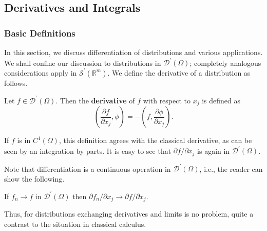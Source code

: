 \subsection{Derivatives and Integrals}\label{sec:distribution-derivatives-integrals}

\subsubsection{Basic Definitions}\label{subsec:distribution-derivative-basic-definitions}

In this section, we discuss differentiation of distributions and various applications. We shall confine our discussion to distributions in $\mathcal{D}^{\prime}(\Omega)$; completely analogous considerations apply in $\mathcal{S}^{\prime}(\mathbb{R}^m)$. We define the derivative of a distribution as follows.

\begin{Definition}
\label{def:distribution-partial-derivative}
Let $f\in\mathcal{D}^{\prime}(\Omega)$. Then the \textbf{derivative} of $f$ with respect to $x_j$ is defined as
\begin{equation}\label{eq:distribution-partial-derivative-definition}
\left(\dfrac{\partial f}{\partial x_j},\phi\right)=-\left(f,\dfrac{\partial\phi}{\partial x_j}\right).
\end{equation}

\end{Definition}

\begin{Remark}
\label{rem:distribution-classical-derivative-agreement}
If $f$ is in $C^1(\Omega)$, this definition agrees with the classical derivative, as can be seen by an integration by parts. It is easy to see that $\partial f/\partial x_j$ is again in $\mathcal{D}^{\prime}(\Omega)$.
\end{Remark}

Note that differentiation is a continuous operation in $\mathcal{D}^{\prime}(\Omega)$, i.e., the reader can show the following.

\begin{Theorem}
\label{thm:distribution-derivative-continuity}
If $f_n\to f$ in $\mathcal{D}^{\prime}(\Omega)$ then $\partial f_n/\partial x_j\to\partial f/\partial x_j$.
\end{Theorem}

Thus, for distributions exchanging derivatives and limits is no problem, quite a contrast to the situation in classical calculus.

